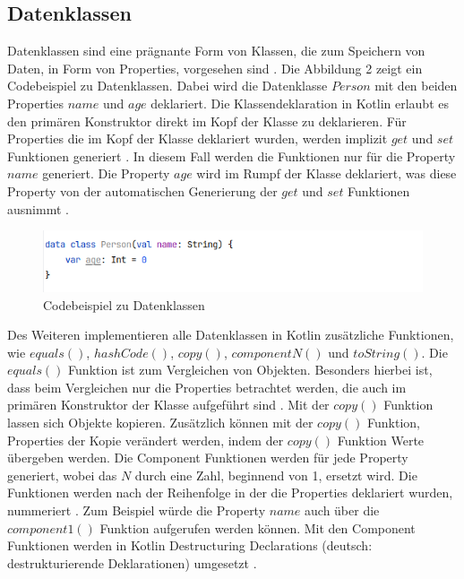 \documentclass{article}
\begin{document}
\subsection{Datenklassen}
Datenklassen sind eine prägnante Form von Klassen, die zum Speichern von Daten, in Form von Properties, vorgesehen sind \cite{KotlinLangDataClass}. Die Abbildung 2 zeigt ein Codebeispiel zu Datenklassen. Dabei wird die Datenklasse $Person$ mit den beiden Properties $name$ und $age$ deklariert. Die Klassendeklaration in Kotlin erlaubt es den primären Konstruktor direkt im Kopf der Klasse zu deklarieren. Für Properties die im Kopf der Klasse deklariert wurden, werden implizit $get$ und $set$ Funktionen generiert \cite{KotlinLangDataClass}. In diesem Fall werden die Funktionen nur für die Property $name$ generiert. Die Property $age$ wird im Rumpf der Klasse deklariert, was diese Property von der automatischen Generierung der $get$ und $set$ Funktionen ausnimmt \cite{KotlinLangDataClass}.
\begin{figure}[!htb]
    \raggedright
    \includegraphics[width=\linewidth]{img/data_class.png}
    \caption{Codebeispiel zu Datenklassen\footnotemark}
\end{figure}
\newline
Des Weiteren implementieren alle Datenklassen in Kotlin zusätzliche Funktionen, wie $equals()$, $hashCode()$, $copy()$, $componentN()$ und $toString()$. Die $equals()$ Funktion ist zum Vergleichen von Objekten. Besonders hierbei ist, dass beim Vergleichen nur die Properties betrachtet werden, die auch im primären Konstruktor der Klasse aufgeführt sind \cite{KotlinLangDataClass}. Mit der $copy()$ Funktion lassen sich Objekte kopieren. Zusätzlich können mit der $copy()$ Funktion, Properties der Kopie verändert werden, indem der $copy()$ Funktion Werte übergeben werden. Die Component Funktionen werden für jede Property generiert, wobei das $N$ durch eine Zahl, beginnend von 1, ersetzt wird. Die Funktionen werden nach der Reihenfolge in der die Properties deklariert wurden, nummeriert \cite{KotlinLangDataClass}. Zum Beispiel würde die Property $name$ auch über die $component1()$ Funktion aufgerufen werden können. Mit den Component Funktionen werden in Kotlin Destructuring Declarations (deutsch: destrukturierende Deklarationen) umgesetzt \cite{KotlinLangDataClass}.
\end{document}
